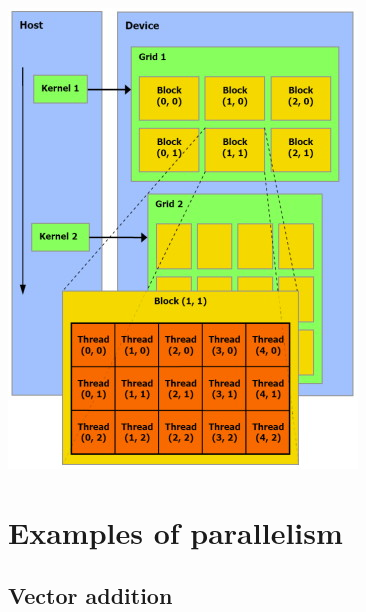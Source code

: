 \documentclass[handout]{beamer}
\numberwithin{equation}{section}
\begin{document}
\begin{frame}
\begin{center}
\includegraphics[scale=.7]{../../fig/gridBlocksThreads.jpg}
\end{center}
\end{frame}


\section{Examples of parallelism}


\subsection{Vector addition}
\end{document}
